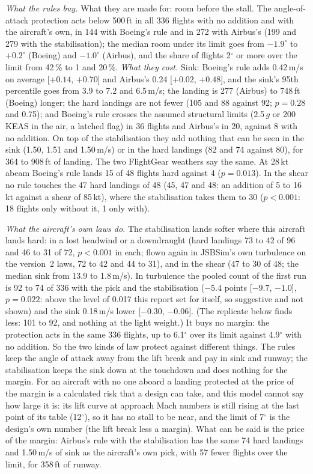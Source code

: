\documentclass[10pt,a4paper,twocolumn]{article}
\begin{document}
\emph{What the rules buy.} What they are made for: room before the stall. The angle-of-attack protection acts below 500\,ft in all 336 flights with no addition and with the aircraft's own, in 144 with Boeing's rule and in 272 with Airbus's
(199 and 279 with the stabilisation); the median room under its limit goes from $-1.9^\circ$ to $+0.2^\circ$ (Boeing) and $-1.0^\circ$ (Airbus), and the share of flights 2$^\circ$ or more over the limit from 42\,\% to 1 and 20\,\%.
\emph{What they cost.} Sink: Boeing's rule adds 0.42\,m/s on average [$+0.14$, $+0.70$] and Airbus's 0.24 [$+0.02$, $+0.48$], and the sink's 95th percentile goes from 3.9 to 7.2 and 6.5\,m/s; the landing is 277 (Airbus) to 748\,ft (Boeing)
longer; the hard landings are not fewer (105 and 88 against 92; $p=0.28$ and 0.75); and Boeing's rule crosses the assumed structural limits (2.5\,$g$ or 200\,KEAS in the air, a latched flag) in 36 flights and Airbus's in 20, against 8 with no addition. On top of the stabilisation they add nothing that can be seen in the sink (1.50, 1.51 and 1.50\,m/s) or in the hard landings (82 and 74 against 80),
for 364 to 908\,ft of landing. The two FlightGear weathers say the same. At 28\,kt abeam Boeing's rule lands 15 of 48 flights hard against 4 ($p=0.013$). In the shear no rule touches the 47 hard landings of 48 (45, 47 and 48: an addition of
5 to 16\,kt against a shear of 85\,kt), where the stabilisation takes them to 30 ($p<0.001$: 18 flights only without it, 1 only with).

\emph{What the aircraft's own laws do.} The stabilisation lands softer where this aircraft lands hard: in a lost headwind or a downdraught (hard landings 73 to 42 of 96 and 46 to 31 of 72, $p<0.001$ in each; flown again in JSBSim's own turbulence on the version~2 laws, 72 to 42 and 44 to 31), and in the
shear (47 to 30 of 48; the median sink from 13.9 to 1.8\,m/s). In turbulence the pooled count of the first run is 92 to 74 of 336 with the pick and the stabilisation ($-5.4$ points [$-9.7$, $-1.0$], $p=0.022$: above the level of 0.017 this report set for
itself, so suggestive and not shown) and the sink 0.18\,m/s lower [$-0.30$, $-0.06$]. (The replicate below finds less: 101 to 92, and nothing at the light weight.) It buys no margin: the protection acts in the same 336 flights, up to 6.1$^\circ$ over its limit against 4.9$^\circ$ with no addition. So the two kinds of law
protect against different things. The rules keep the angle of attack away from the lift break and pay in sink and runway; the stabilisation keeps the sink down at the touchdown and does nothing for the margin. For an aircraft with no one aboard a landing
protected at the price of the margin is a calculated risk that a design can take, and this model cannot say how large it is: its lift curve at approach Mach numbers is still rising at the last point of its table (12$^\circ$), so it has no stall to be near, and the
limit of 7$^\circ$ is the design's own number (the lift break less a margin). What can be said is the price of the margin: Airbus's rule with the stabilisation has the same 74 hard landings and 1.50\,m/s of sink as the aircraft's own pick, with 57 fewer flights over the
limit, for 358\,ft of runway.
\end{document}
